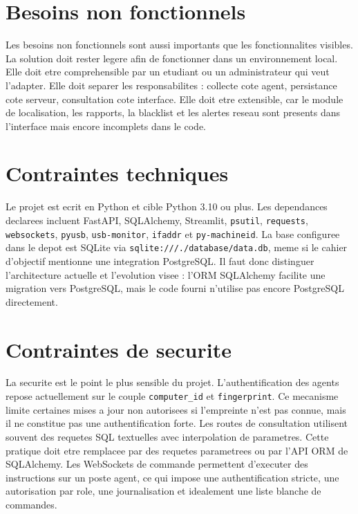 \documentclass[12pt,a4paper]{report}
\begin{document}
\section{Besoins non fonctionnels}
Les besoins non fonctionnels sont aussi importants que les fonctionnalites visibles. La solution doit rester legere afin de fonctionner dans un environnement local. Elle doit etre comprehensible par un etudiant ou un administrateur qui veut l'adapter. Elle doit separer les responsabilites : collecte cote agent, persistance cote serveur, consultation cote interface. Elle doit etre extensible, car le module de localisation, les rapports, la blacklist et les alertes reseau sont presents dans l'interface mais encore incomplets dans le code.

\section{Contraintes techniques}
Le projet est ecrit en Python et cible Python 3.10 ou plus. Les dependances declarees incluent FastAPI, SQLAlchemy, Streamlit, \texttt{psutil}, \texttt{requests}, \texttt{websockets}, \texttt{pyusb}, \texttt{usb-monitor}, \texttt{ifaddr} et \texttt{py-machineid}. La base configuree dans le depot est SQLite via \texttt{sqlite:///./database/data.db}, meme si le cahier d'objectif mentionne une integration PostgreSQL. Il faut donc distinguer l'architecture actuelle et l'evolution visee : l'ORM SQLAlchemy facilite une migration vers PostgreSQL, mais le code fourni n'utilise pas encore PostgreSQL directement.

\section{Contraintes de securite}
La securite est le point le plus sensible du projet. L'authentification des agents repose actuellement sur le couple \texttt{computer\_id} et \texttt{fingerprint}. Ce mecanisme limite certaines mises a jour non autorisees si l'empreinte n'est pas connue, mais il ne constitue pas une authentification forte. Les routes de consultation utilisent souvent des requetes SQL textuelles avec interpolation de parametres. Cette pratique doit etre remplacee par des requetes parametrees ou par l'API ORM de SQLAlchemy. Les WebSockets de commande permettent d'executer des instructions sur un poste agent, ce qui impose une authentification stricte, une autorisation par role, une journalisation et idealement une liste blanche de commandes.
\end{document}
